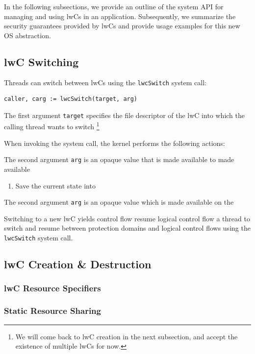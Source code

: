 \documentclass[10pt,twocolumn,letter]{article}
\begin{document}
In the following subsections, we provide an outline of the system API for managing and using lwCs in an application.
Subsequently, we summarize the security guarantees provided by lwCs and provide usage examples for this new OS abstraction. 

\subsection{lwC Switching}\label{design:switching}
Threads can switch between lwCs using the \lstinline{lwcSwitch} system call:

\begin{lstlisting}[float=h]
  caller, carg := lwcSwitch(target, arg) 
\end{lstlisting}

The first argument \lstinline{target} specifies the file descriptor of the lwC into which the calling thread wants to switch%
\footnote{We will come back to lwC creation in the next subsection, and accept the existence of multiple lwCs for now.}

When invoking the system call, the kernel performs the following actions:

The second argument \lstinline{arg} is an opaque value that is made available to  made available 
\begin{enumerate}
  \item Save the current state into 
\end{enumerate}

The second argument \lstinline{arg} is an opaque value which is made available on the 


Switching to a new lwC yields control flow 
resume logical control flow a thread to switch and resume between protection domains and logical control flows using the \lstinline{lwcSwitch} system call.


\subsection{lwC Creation \& Destruction}\label{design:createdestroy}

\subsubsection{lwC Resource Specifiers}\label{design:rspecs}
\subsubsection{Static Resource Sharing}
\end{document}
